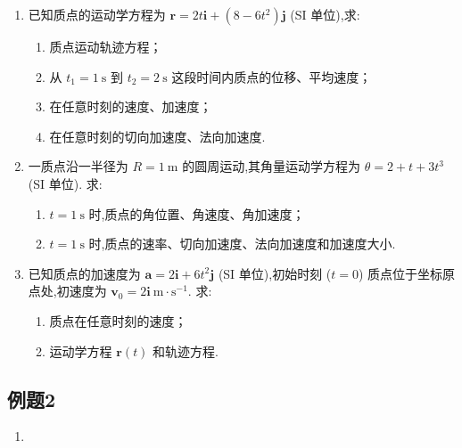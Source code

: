 \begin{enumerate}
\begin{enumerate}
	\end{enumerate}
	
	
	\item[\textbf{L1-5}]
	已知质点的运动学方程为 $\boldsymbol{r} = 2t\boldsymbol{i} + (8 - 6t^2)\boldsymbol{j}$ (SI 单位),求:
	
	\begin{enumerate}
		\item 质点运动轨迹方程；
		\item 从 $t_1 = 1\mathrm{\ s}$ 到 $t_2 = 2\mathrm{\ s}$ 这段时间内质点的位移、平均速度；
		\item 在任意时刻的速度、加速度；
		\item 在任意时刻的切向加速度、法向加速度.
		
	\end{enumerate}
	
	
	\item [\textbf{L1-6}]
	一质点沿一半径为 $R = 1 \mathrm{\ m}$ 的圆周运动,其角量运动学方程为 $\theta = 2 + t + 3t^3$ (SI 单位). 求:
	
	\begin{enumerate}
		\item $t = 1 \mathrm{\ s}$ 时,质点的角位置、角速度、角加速度；
		\item $t = 1 \mathrm{\ s}$ 时,质点的速率、切向加速度、法向加速度和加速度大小.
	\end{enumerate}
	
	
	\item [\textbf{L1-7}]
	已知质点的加速度为 $\boldsymbol{a} = 2\boldsymbol{i} + 6t^2\boldsymbol{j}$ (SI 单位),初始时刻 ($t=0$) 质点位于坐标原点处,初速度为 $\boldsymbol{v}_0 = 2\boldsymbol{i} \mathrm{\ m \cdot s^{-1}}$. 求:
	
	\begin{enumerate}
		
		\item 质点在任意时刻的速度；
		\item 运动学方程 $\boldsymbol{r}(t)$ 和轨迹方程.
		
	\end{enumerate}
	
	
\end{enumerate}

\subsection{例题2}

\begin{enumerate}
	\item
\end{enumerate}


